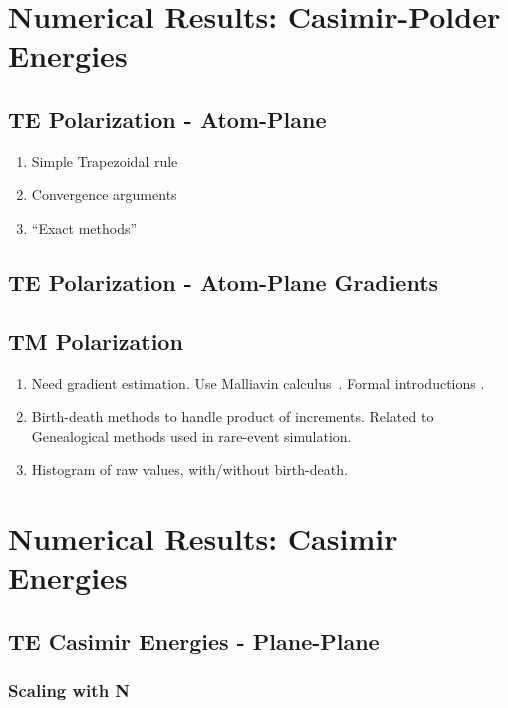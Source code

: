 \section{Numerical Results: Casimir-Polder Energies}

    \subsection{TE Polarization - Atom-Plane}
    \begin{enumerate}
      \item Simple Trapezoidal rule
      \item Convergence arguments
      \item ``Exact methods''
    \end{enumerate}

    \subsection{TE Polarization - Atom-Plane Gradients}

    
    \subsection{TM Polarization}

    \begin{enumerate}
      \item Need gradient estimation.  Use Malliavin calculus~\cite{Fournie1999, Chen2007,Kohatsu-Higa2003}.
        Formal introductions \cite{Nualart2006, Malliavin2006, DiNunno2009}.
      \item Birth-death methods to handle product of increments.  Related to Genealogical 
        methods used in rare-event simulation.  
      \item Histogram of raw values, with/without birth-death.
    \end{enumerate}


\section{Numerical Results: Casimir Energies}

\subsection{TE Casimir Energies - Plane-Plane}


\subsubsection{Scaling with N}


